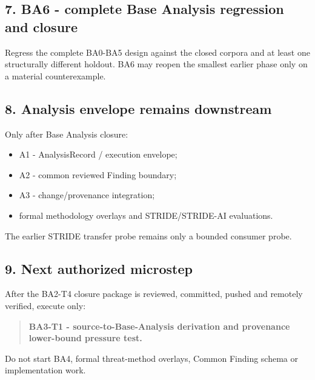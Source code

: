 \documentclass[11pt,a4paper]{article}
\providecommand{\tightlist}{\setlength{\itemsep}{0pt}\setlength{\parskip}{0pt}}
\begin{document}
\subsection{7. BA6 - complete Base Analysis regression and closure}\label{ba6---complete-base-analysis-regression-and-closure}

Regress the complete BA0-BA5 design against the closed corpora and at least one structurally different holdout. BA6 may reopen the smallest earlier phase only on a material counterexample.

\subsection{8. Analysis envelope remains downstream}\label{analysis-envelope-remains-downstream}

Only after Base Analysis closure:

\begin{itemize}
\tightlist
\item
  A1 - AnalysisRecord / execution envelope;
\item
  A2 - common reviewed Finding boundary;
\item
  A3 - change/provenance integration;
\item
  formal methodology overlays and STRIDE/STRIDE-AI evaluations.
\end{itemize}

The earlier STRIDE transfer probe remains only a bounded consumer probe.

\subsection{9. Next authorized microstep}\label{next-authorized-microstep}

After the BA2-T4 closure package is reviewed, committed, pushed and remotely verified, execute only:

\begin{quote}
\textbf{BA3-T1 - source-to-Base-Analysis derivation and provenance lower-bound pressure test.}
\end{quote}

Do not start BA4, formal threat-method overlays, Common Finding schema or implementation work.
\end{document}
